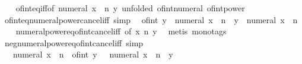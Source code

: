 \begin{isabellebody}
%
\isadelimproof
\ \ %
\endisadelimproof
%
\isatagproof
{}\isamarkupfalse%
\ of{\isacharunderscore}{\kern0pt}int{\isacharunderscore}{\kern0pt}eq{\isacharunderscore}{\kern0pt}iff{\isacharbrackleft}{\kern0pt}of\ {\isachardoublequoteopen}numeral\ x\ {\isacharcircum}{\kern0pt}\ n{\isachardoublequoteclose}\ y{\isacharcomma}{\kern0pt}\ unfolded\ of{\isacharunderscore}{\kern0pt}int{\isacharunderscore}{\kern0pt}numeral\ of{\isacharunderscore}{\kern0pt}int{\isacharunderscore}{\kern0pt}power{\isacharbrackright}{\kern0pt}\ \isacommand{{\isachardot}{\kern0pt}}\isamarkupfalse%
%
\endisatagproof
{\isafoldproof}%
%
\isadelimproof
\isanewline
%
\endisadelimproof
\isanewline
{}\isamarkupfalse%
\ of{\isacharunderscore}{\kern0pt}int{\isacharunderscore}{\kern0pt}eq{\isacharunderscore}{\kern0pt}numeral{\isacharunderscore}{\kern0pt}power{\isacharunderscore}{\kern0pt}cancel{\isacharunderscore}{\kern0pt}iff\ {\isacharbrackleft}{\kern0pt}simp{\isacharbrackright}{\kern0pt}{\isacharcolon}{\kern0pt}\isanewline
\ \ {\isachardoublequoteopen}of{\isacharunderscore}{\kern0pt}int\ y\ {\isacharequal}{\kern0pt}\ numeral\ x\ {\isacharcircum}{\kern0pt}\ n\ {\isasymlongleftrightarrow}\ y\ {\isacharequal}{\kern0pt}\ numeral\ x\ {\isacharcircum}{\kern0pt}\ n{\isachardoublequoteclose}\isanewline
%
\isadelimproof
\ \ %
\endisadelimproof
%
\isatagproof
{}\isamarkupfalse%
\ numeral{\isacharunderscore}{\kern0pt}power{\isacharunderscore}{\kern0pt}eq{\isacharunderscore}{\kern0pt}of{\isacharunderscore}{\kern0pt}int{\isacharunderscore}{\kern0pt}cancel{\isacharunderscore}{\kern0pt}iff\ {\isacharbrackleft}{\kern0pt}of\ x\ n\ y{\isacharbrackright}{\kern0pt}\ \isamarkupfalse%
\ {\isacharparenleft}{\kern0pt}metis\ {\isacharparenleft}{\kern0pt}mono{\isacharunderscore}{\kern0pt}tags{\isacharparenright}{\kern0pt}{\isacharparenright}{\kern0pt}%
\endisatagproof
{\isafoldproof}%
%
\isadelimproof
\isanewline
%
\endisadelimproof
\isanewline
{}\isamarkupfalse%
\ neg{\isacharunderscore}{\kern0pt}numeral{\isacharunderscore}{\kern0pt}power{\isacharunderscore}{\kern0pt}eq{\isacharunderscore}{\kern0pt}of{\isacharunderscore}{\kern0pt}int{\isacharunderscore}{\kern0pt}cancel{\isacharunderscore}{\kern0pt}iff\ {\isacharbrackleft}{\kern0pt}simp{\isacharbrackright}{\kern0pt}{\isacharcolon}{\kern0pt}\isanewline
\ \ {\isachardoublequoteopen}{\isacharparenleft}{\kern0pt}{\isacharminus}{\kern0pt}\ numeral\ x{\isacharparenright}{\kern0pt}\ {\isacharcircum}{\kern0pt}\ n\ {\isacharequal}{\kern0pt}\ of{\isacharunderscore}{\kern0pt}int\ y\ {\isasymlongleftrightarrow}\ {\isacharparenleft}{\kern0pt}{\isacharminus}{\kern0pt}\ numeral\ x{\isacharparenright}{\kern0pt}\ {\isacharcircum}{\kern0pt}\ n\ {\isacharequal}{\kern0pt}\ y{\isachardoublequoteclose}\isanewline

\end{isabellebody}
